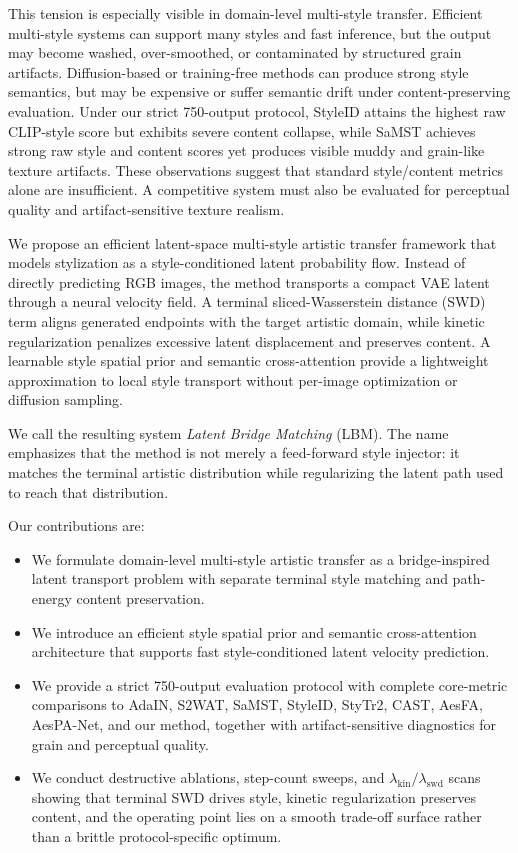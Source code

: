 ﻿\documentclass[letterpaper]{article}
\begin{document}
This tension is especially visible in domain-level multi-style transfer. Efficient multi-style systems can support many styles and fast inference, but the output may become washed, over-smoothed, or contaminated by structured grain artifacts. Diffusion-based or training-free methods can produce strong style semantics, but may be expensive or suffer semantic drift under content-preserving evaluation. Under our strict 750-output protocol, StyleID attains the highest raw CLIP-style score but exhibits severe content collapse, while SaMST achieves strong raw style and content scores yet produces visible muddy and grain-like texture artifacts. These observations suggest that standard style/content metrics alone are insufficient. A competitive system must also be evaluated for perceptual quality and artifact-sensitive texture realism.

We propose an efficient latent-space multi-style artistic transfer framework that models stylization as a style-conditioned latent probability flow. Instead of directly predicting RGB images, the method transports a compact VAE latent through a neural velocity field. A terminal sliced-Wasserstein distance (SWD) term aligns generated endpoints with the target artistic domain, while kinetic regularization penalizes excessive latent displacement and preserves content. A learnable style spatial prior and semantic cross-attention provide a lightweight approximation to local style transport without per-image optimization or diffusion sampling.

We call the resulting system \emph{Latent Bridge Matching} (LBM). The name emphasizes that the method is not merely a feed-forward style injector: it matches the terminal artistic distribution while regularizing the latent path used to reach that distribution.

Our contributions are:
\begin{itemize}
    \item We formulate domain-level multi-style artistic transfer as a bridge-inspired latent transport problem with separate terminal style matching and path-energy content preservation.
    \item We introduce an efficient style spatial prior and semantic cross-attention architecture that supports fast style-conditioned latent velocity prediction.
    \item We provide a strict 750-output evaluation protocol with complete core-metric comparisons to AdaIN, S2WAT, SaMST, StyleID, StyTr2, CAST, AesFA, AesPA-Net, and our method, together with artifact-sensitive diagnostics for grain and perceptual quality.
    \item We conduct destructive ablations, step-count sweeps, and $\lambda_{\mathrm{kin}}/\lambda_{\mathrm{swd}}$ scans showing that terminal SWD drives style, kinetic regularization preserves content, and the operating point lies on a smooth trade-off surface rather than a brittle protocol-specific optimum.
\end{itemize}
\end{document}
